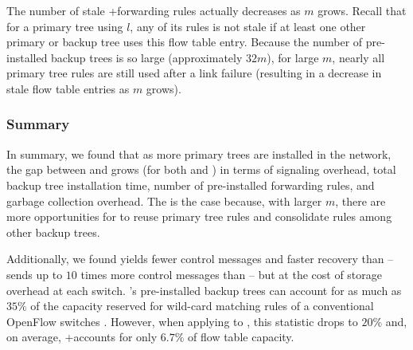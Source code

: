 The number of stale \pres+\merge forwarding rules actually decreases as $m$ grows.  
Recall that for a primary tree using $l$, any of its rules is not stale if at least one other primary or backup tree uses this flow table entry. 
Because the number of pre-installed backup trees is so large (approximately $32m$), for large $m$, nearly all primary tree rules are still used after a link failure (resulting
in a decrease in stale flow table entries as $m$ grows).



\subsubsection{Summary}

In summary, we found that as more primary trees are installed in the network, the gap between \merge and \base grows (for both \post and \pres) in terms of signaling overhead, 
total backup tree installation time, number of pre-installed forwarding rules, and garbage collection overhead.  The is the case 
because, with larger $m$, there are more opportunities for \merge to reuse primary tree rules and consolidate rules among other backup trees.

Additionally, we found \pre yields fewer control messages and faster recovery than \post -- \post sends up to $10$ times more control messages than \pre --
but at the cost of storage overhead at each switch. \pres's pre-installed backup trees can account for as much as $35\%$ of the capacity reserved for wild-card matching rules 
of a conventional OpenFlow switches \cite{Curtis11}. However, when applying \merge to \pres, this statistic drops to $20\%$ and, on average, \pres+\merge accounts for only $6.7\%$ of flow
table capacity.


